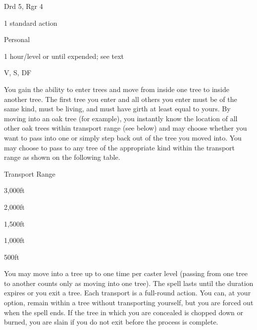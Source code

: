 
\begin{description*}
\item[Level:] Drd 5, Rgr 4
\item[Casting Time:] 1 standard action
\item[Range:] Personal
\item[Duration:] 1 hour/level or until expended; see text
\item[Components:] V, S, DF
\end{description*}

You gain the ability to enter trees and move from inside one tree to inside another
tree. The first tree you enter and all others you enter must be of the same kind,
must be living, and must have girth at least equal to yours. By moving into an
oak tree (for example), you instantly know the location of all other oak trees
within transport range (see below) and may choose whether you want to pass into
one or simply step back out of the tree you moved into. You may choose to pass
to any tree of the appropriate kind within the transport range as shown on the
following table.
\begin{description*}
\item[Type of Tree] Transport Range
\item[Oak / Ash / Yew] 3,000ft
\item[Elm / Linden] 2,000ft
\item[Other deciduous] 1,500ft
\item[Any coniferous] 1,000ft
\item[All other trees] 500ft
\end{description*}
You may move into a tree up to one time per caster level (passing from one tree
to another counts only as moving into one tree). The spell lasts until the duration
expires or you exit a tree. Each transport is a full-round action.
You can, at your option, remain within a tree without transporting yourself, but
you are forced out when the spell ends. If the tree in which you are concealed
is chopped down or burned, you are slain if you do not exit before the process
is complete.